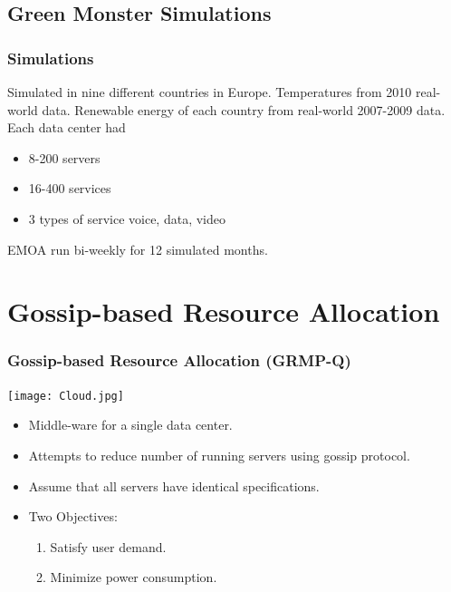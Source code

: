 \documentclass{beamer}
\begin{document}
\subsection[Simulations]{Green Monster Simulations}

\begin{frame}
\frametitle{Simulations}
	Simulated in nine different countries in Europe. \linebreak
	\linebreak
	Temperatures from 2010 real-world data.
	\linebreak
	\linebreak
	Renewable energy of each country from real-world 2007-2009 data. 
	\linebreak
	\linebreak
	Each data center had
		\begin{itemize}
			\item 8-200 servers
			\item 16-400 services
			\item 3 types of service voice, data, video
	
		\end{itemize}
		EMOA run bi-weekly for 12 simulated months.
\end{frame}

\section[GRMP-Q]{Gossip-based Resource Allocation}

\begin{frame}
	\frametitle{Gossip-based Resource Allocation (GRMP-Q)}
		\texttt{[image: Cloud.jpg]}

	\begin{itemize}
		\item Middle-ware for a single data center.
		\item Attempts to reduce number of running servers using gossip protocol.
		\item Assume that all servers have identical specifications.
		\item Two Objectives:
			\begin{enumerate}
				\item Satisfy user demand.
				\item Minimize power consumption.
			\end{enumerate}
	\end{itemize}
\end{frame}
\end{document}
